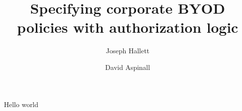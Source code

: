 \documentclass{easychair}
\title{Specifying corporate BYOD policies with authorization logic}
\author{
  Joseph Hallett\inst{1}
  \and
  David Aspinall\inst{1}
}
\institute{
  University of Edinburgh
}
\begin{document}
\maketitle

Hello world
\end{document}
